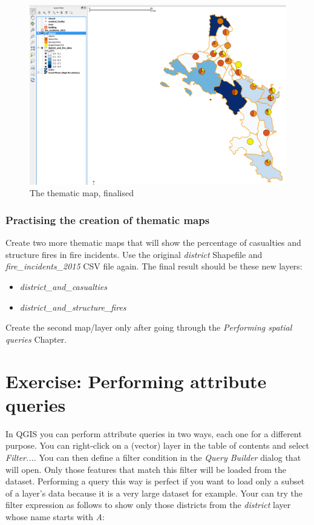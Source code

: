 \documentclass[a4paper,12pt,titlepage]{article}
\begin{document}
\begin{figure}[htb]
\centering
\includegraphics[width=12cm]{Images/thematic_final.png}
\caption{The thematic map, finalised}\label{fig:thematic_final}
\end{figure}

\subsubsection{Practising the creation of thematic maps}
Create two more thematic maps that will show the percentage of casualties and structure fires in fire incidents. Use the original \textit{district} Shapefile and \textit{fire\_incidents\_2015} CSV file again. The final result should be these new layers:

\begin{itemize}
\item \textit{district\_and\_casualties}
\item \textit{district\_and\_structure\_fires}
\end{itemize}

Create the second map/layer only after going through the \textit{Performing spatial queries} Chapter. 


\section{Exercise: Performing attribute queries}
In QGIS you can perform attribute queries in two ways, each one for a different purpose. You can right-click on a (vector) layer in the table of contents and select \textit{Filter...}. You can then define a filter condition in the \textit{Query Builder} dialog that will open. Only those features that match this filter will be loaded from the dataset. Performing a query this way is perfect if you want to load only a subset of a layer's data because it is a very large dataset for example.
Your can try the filter expression as follows to show only those districts from the \textit{district} layer whose name starts with \textit{A}:
\end{document}
